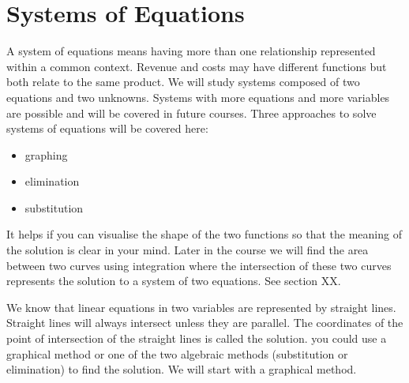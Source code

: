  
 \section{Systems of Equations}\label{sec:systemsOfEquations}
 A system of equations means having more than one relationship represented within a common context. Revenue and costs may have different functions but both relate to the same product. We will study systems composed of two equations and two unknowns. Systems with more equations and more variables are possible and will be covered in future courses. Three approaches to solve systems of equations will be covered here:
 \begin{multicols}{3}
  \begin{itemize}
 	\setlength\itemsep{0em}
 	\item graphing\columnbreak
 	\item elimination\columnbreak
 	\item substitution
 \end{itemize}
\end{multicols}
It helps if you can visualise the shape of the two functions so that the meaning of the solution is clear in your mind. Later in the course we will find the area between two curves using integration where the intersection of these two curves represents the solution to a system of two equations. See section XX.
 
 We know that linear equations in two variables are represented by straight lines. Straight
 lines will always intersect unless they are parallel. The coordinates of the point of intersection of the straight lines is called the solution. you could use a graphical method or one of the two algebraic methods (substitution or elimination) to find the solution.  We will start with a graphical method. 
 
